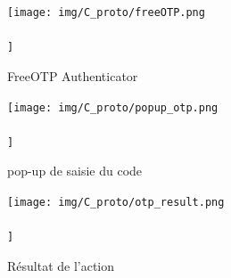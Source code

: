 \documentclass[a4paper, 10pt]{article}
\begin{document}
\begin{figure}[H]
        \centering
        \texttt{[image: img/C\_proto/freeOTP.png\\\\]}
        \caption{FreeOTP Authenticator}
        \label{fig:freeotp}
\end{figure}


\begin{figure}[H]
        \centering
        \texttt{[image: img/C\_proto/popup\_otp.png\\\\]}
        \caption{pop-up de saisie du code}
        \label{fig:proto-popup}
\end{figure}


\begin{figure}[H]
        \centering
        \texttt{[image: img/C\_proto/otp\_result.png\\\\]}
        \caption{Résultat de l'action}
        \label{fig:proto-result}
\end{figure}
\end{document}
